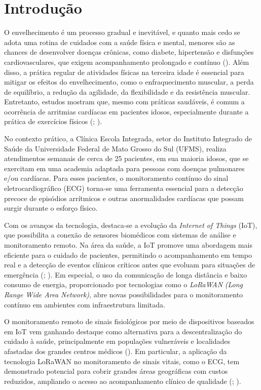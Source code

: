 \chapter{Introdução}
 

O envelhecimento é um processo gradual e inevitável, e quanto mais cedo se adota uma rotina de cuidados com a saúde física e mental, menores são as chances de desenvolver doenças crônicas, como diabete, hipertensão e disfunções cardiovasculares, que exigem acompanhamento prolongado e contínuo (). Além disso, a prática regular de atividades físicas na terceira idade é essencial para mitigar os efeitos do envelhecimento, como o enfraquecimento muscular, a perda de equilíbrio, a redução da agilidade, da flexibilidade e da resistência muscular. Entretanto, estudos mostram que, mesmo com práticas saudáveis, é comum a ocorrência de arritmias cardíacas em pacientes idosos, especialmente durante a prática de exercícios físicos (; ). 

No contexto prático, a Clínica Escola Integrada, setor do Instituto Integrado de Saúde da Universidade Federal de Mato Grosso do Sul (UFMS), realiza atendimentos semanais de cerca de 25 pacientes, em sua maioria idosos, que se exercitam em uma academia adaptada para pessoas com doenças pulmonares e/ou cardíacas. Para esses pacientes, o monitoramento contínuo do sinal eletrocardiográfico (ECG) torna-se uma ferramenta essencial para a detecção precoce de episódios arrítmicos e outras anormalidades cardíacas que possam surgir durante o esforço físico.

Com os avanços da tecnologia, destaca-se a evolução da \textit{Internet of Things} (\acs{IoT}), que possibilita a conexão de sensores biomédicos com sistemas de análise e monitoramento remoto. Na área da saúde, a \acs{IoT} promove uma abordagem mais eficiente para o cuidado de pacientes, permitindo o acompanhamento em tempo real e a detecção de eventos clínicos críticos antes que evoluam para situações de emergência (; ). Em especial, o uso da comunicação de longa distância e baixo consumo de energia, proporcionado por tecnologias como o \textit{LoRaWAN} \textit{(Long Range Wide Area Network)}, abre novas possibilidades para o monitoramento contínuo em ambientes com infraestrutura limitada.

O monitoramento remoto de sinais fisiológicos por meio de dispositivos baseados em \acs{IoT} vem ganhando destaque como alternativa para a descentralização do cuidado à saúde, principalmente em populações vulneráveis e localidades afastadas dos grandes centros médicos (). Em particular, a aplicação da tecnologia LoRaWAN no monitoramento de sinais vitais, como o ECG, tem demonstrado potencial para cobrir grandes áreas geográficas com custos reduzidos, ampliando o acesso ao acompanhamento clínico de qualidade (; ).


